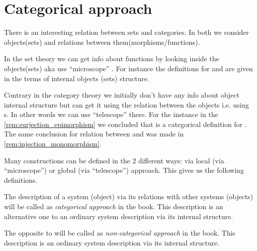 \section{Categorical approach}
\label{ch:categorical_approach}

There is an interesting relation between sets and categories. In both
we consider objects(sets) and relations between them(morphisms/functions). 

In the set theory we can get info about functions by looking inside
the objects(sets) aka use ``microscope''
\cite{bib:milewski2018category}. For instance the definitions for  
 and   are given in
the terms of internal objects (sets) structure.

Contrary in the category theory we initially don't have any info about object
internal structure but can get it using the relation between the
objects i.e. using s. In other words we can use
``telescope'' \cite{bib:milewski2018category}  there. For the instance 
in the \cref{rem:surjection_epimorphism} we concluded that
 is a categorical definition for
. The same conclusion for relation between
 and  was made in
\cref{rem:injection_monomorphism}.

Many constructions can be defined in the 2 different ways: via
local (via ``microscope'') or global (via ``telescope'') approach.
This gives us the following definitions. 
\begin{definition}
\label{def:categorical_approach}
The description of a system (object) via its relations with other
systems (objects) will be called as  \textit{categorical approach} in
the book. This description is an alternative one to an ordinary system
description via its internal structure.
\end{definition}
\begin{definition}
\label{def:non_categorical_approach}
The opposite to  will be called as
 \textit{non-categorical approach} in
the book. This description is an ordinary system
description via its internal structure.
\end{definition}

